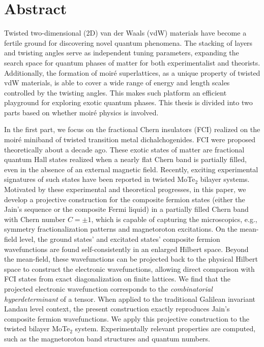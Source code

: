 \chapter*{Abstract}

Twisted two-dimensional (2D) van der Waals (vdW) materials have become a fertile ground for discovering novel quantum phenomena. The stacking of layers and twisting angles serve as independent tuning parameters, expanding the search space for quantum phases of matter for both experimentalist and theorists. Additionally, the formation of moiré superlattices, as a unique property of twisted vdW materials, is able to cover a wide range of energy and length scales controlled by the twisting angles. This makes such platform an efficient playground for exploring exotic quantum phases. This thesis is divided into two parts based on whether moiré physics is involved.

In the first part, we focus on the fractional Chern insulators (FCI) realized on the moir\'e miniband of twisted transition metal dichalchogenides. FCI were proposed theoretically about a decade ago. These exotic states of matter are fractional quantum Hall states realized when a nearly flat Chern band is partially filled, even in the absence of an external magnetic field. Recently, exciting experimental signatures of such states have been reported in twisted MoTe$_2$ bilayer systems. Motivated by these experimental and theoretical progresses, in this paper, we develop a projective construction for the composite fermion states (either the  Jain's sequence or the composite Fermi liquid) in a partially filled Chern band with Chern number $C=\pm1$, which is capable of capturing the microscopics, e.g., symmetry fractionalization patterns and magnetoroton excitations. On the mean-field level, the ground states' and excitated states' composite fermion wavefunctions are found self-consistently in an enlarged Hilbert space. Beyond the mean-field, these wavefunctions can be projected back to the physical Hilbert space to construct the electronic wavefunctions, allowing direct comparison with FCI states from exact diagonalization on finite lattices. We find that the projected electronic wavefunction corresponds to the \emph{combinatorial hyperdeterminant} of a tensor. When applied to the traditional Galilean invariant Landau level context, the present construction exactly reproduces Jain's composite fermion wavefunctions. We apply this projective construction to the twisted bilayer MoTe$_2$ system. Experimentally relevant properties are computed, such as the magnetoroton band structures and quantum numbers.

